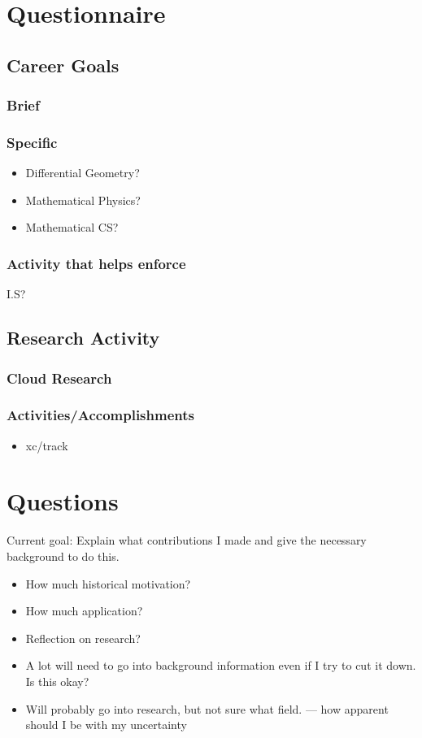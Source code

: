 \documentclass{article}[11pt]
\theoremstyle{definition}
\begin{document}
\section{Questionnaire}

\subsection{Career Goals}
\subsubsection{Brief}

\subsubsection{Specific}
\begin{itemize}
    \item Differential Geometry?
    \item Mathematical Physics?
    \item Mathematical CS?
\end{itemize}
\subsubsection{Activity that helps enforce}
I.S?

\subsection{Research Activity}
\subsubsection{Cloud Research}
\subsubsection{Activities/Accomplishments}
\begin{itemize}
    \item xc/track
\end{itemize}
\subsubsection{}
\section{Questions}
Current goal: Explain what contributions I made and give the necessary
background to do this.
\begin{itemize}
    \item How much historical motivation?
    \item How much application?
    \item Reflection on research?
    \item A lot will need to go into background information even if I try
        to cut it down. Is this okay?
    \item Will probably go into research, but not sure what field. --- how
        apparent should I be with my uncertainty
\end{itemize}
\end{document}
